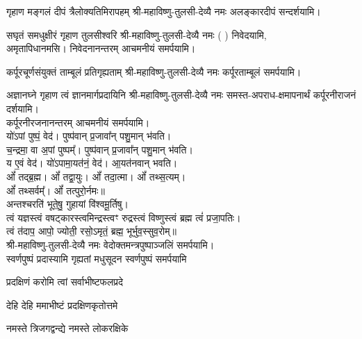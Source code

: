 {गृहाण मङ्गलं दीपं त्रैलोक्यतिमिरापहम्}
श्री-महाविष्णु-तुलसी-देव्यै नमः अलङ्कारदीपं सन्दर्शयामि।

{सघृतं समधुक्षीरं गृहाण तुलसीश्वरि}
श्री-महाविष्णु-तुलसी-देव्यै नमः (	) निवेदयामि, \\
अमृतापिधानमसि। निवेदनानन्तरम् आचमनीयं समर्पयामि।

{कर्पूरचूर्णसंयुक्तं ताम्बूलं प्रतिगृह्यताम्}
श्री-महाविष्णु-तुलसी-देव्यै नमः कर्पूरताम्बूलं समर्पयामि।

{अज्ञानघ्ने गृहाण त्वं ज्ञानमार्गप्रदायिनि}
श्री-महाविष्णु-तुलसी-देव्यै नमः समस्त-अपराध-क्षमापनार्थं कर्पूरनीराजनं दर्शयामि।\\
कर्पूरनीरजनानन्तरम् आचमनीयं समर्पयामि।\\

यो॑ऽपां पुष्पं॒ वेद॑। पुष्प॑वान् प्र॒जावा᳚न् पशु॒मान् भ॑वति।\\
च॒न्द्रमा॒ वा अ॒पां पुष्पम्᳚। पुष्प॑वान् प्र॒जावा᳚न् पशु॒मान् भ॑वति।\\
य ए॒वं वेद॑। यो॑ऽपामा॒यत॑नं॒ वेद॑। आ॒यत॑नवान् भवति।\\

ओं᳚ तद्ब्र॒ह्म। ओं᳚ तद्वा॒युः। ओं᳚ तदा॒त्मा। ओं᳚ तथ्स॒त्यम्‌।\\
ओं᳚ तथ्सर्वम्᳚‌। ओं᳚ तत्पुरो॒र्नमः॥\\

अन्तश्चरति॑ भूते॒षु॒ गुहायां वि॑श्वमू॒र्तिषु। \\
त्वं यज्ञस्त्वं वषट्कारस्त्वमिन्द्रस्त्वꣳ रुद्रस्त्वं विष्णुस्त्वं ब्रह्म त्वं॑ प्रजा॒पतिः। \\
त्वं त॑दाप॒ आपो॒ ज्योती॒ रसो॒ऽमृतं॒ ब्रह्म॒ भूर्भुव॒स्सुव॒रोम्‌॥\\

श्री-महाविष्णु-तुलसी-देव्यै नमः वेदोक्तमन्त्रपुष्पाञ्जलिं समर्पयामि।\\

{स्वर्णपुष्पं प्रदास्यामि गृह्यतां मधुसूदन}
स्वर्णपुष्पं समर्पयामि

{प्रदक्षिणं करोमि त्वां सर्वाभीष्टफलप्रदे}

{देहि देहि ममाभीष्टं प्रदक्षिणकृतोत्तमे}

{नमस्ते त्रिजगद्वन्द्ये नमस्ते लोकरक्षिके}

